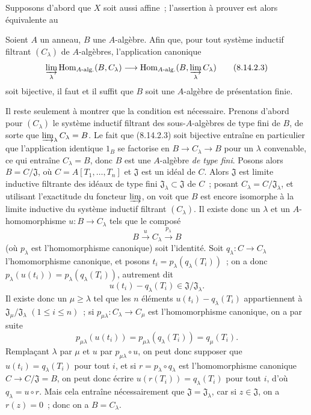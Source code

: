 Supposons d'abord que $X$ soit aussi affine~; l'assertion à prouver est alors
équivalente au

\begin{corollary}[8.14.2.2]
\label{IV.8.14.2.2-fr}
Soient $A$ un anneau, $B$ une $A$-algèbre. Afin que, pour tout système
inductif filtrant $(C_\lambda)$ de $A$-algèbres, l'application canonique
\begin{equation}
\label{IV.8.14.2.3-fr}
\varinjlim_\lambda\operatorname{Hom}_{A\text{-}\mathrm{alg.}}(B,C_\lambda)
\longrightarrow
\operatorname{Hom}_{A\text{-}\mathrm{alg.}}
(B,\varinjlim_\lambda C_\lambda) \tag{8.14.2.3}
\end{equation}
soit bijective, il faut et il suffit que $B$ soit une $A$-algèbre de
présentation finie.
\end{corollary}

Il reste seulement à montrer que la condition est nécessaire. Prenons d'abord
pour $(C_\lambda)$ le système inductif filtrant des sous-$A$-algèbres de type
fini de $B$, de sorte que $\varinjlim_\lambda C_\lambda=B$. Le fait que (8.14.2.3)
soit bijective entraîne en particulier que l'application identique
$1_B$ se factorise en $B\to C_\lambda\to B$ pour un $\lambda$ convenable,
ce qui entraîne $C_\lambda=B$, donc $B$ est une $A$-algèbre \emph{de type
fini}. Posons alors $B=C/\mathfrak J$, où
$C=A[T_1,\ldots,T_n]$ et $\mathfrak J$ est un idéal de $C$. Alors
$\mathfrak J$ est limite inductive filtrante des idéaux de type fini
$\mathfrak J_\lambda\subset\mathfrak J$ de $C$~; posant
$C_\lambda=C/\mathfrak J_\lambda$, et utilisant l'exactitude du foncteur
$\varinjlim$, on voit que $B$ est encore isomorphe à la limite inductive du
système inductif filtrant $(C_\lambda)$. Il existe donc un $\lambda$ et un
$A$-homomorphisme $u:B\to C_\lambda$ tels que le composé
\[
B\xrightarrow{u}C_\lambda\xrightarrow{p_\lambda}B
\]
(où $p_\lambda$ est l'homomorphisme canonique) soit l'identité. Soit
$q_\lambda:C\to C_\lambda$ l'homomorphisme canonique, et posons
$t_i=p_\lambda(q_\lambda(T_i))$~; on a donc
$p_\lambda(u(t_i))=p_\lambda(q_\lambda(T_i))$, autrement dit
\[
u(t_i)-q_\lambda(T_i)\in\mathfrak J/\mathfrak J_\lambda.
\]
Il existe donc un $\mu\geqslant\lambda$ tel que les $n$ éléments
$u(t_i)-q_\lambda(T_i)$ appartiennent à
$\mathfrak J_\mu/\mathfrak J_\lambda$ $(1\leqslant i\leqslant n)$~; si
$p_{\mu\lambda}:C_\lambda\to C_\mu$ est l'homomorphisme canonique, on a par
suite
\[
p_{\mu\lambda}(u(t_i))
=p_{\mu\lambda}(q_\lambda(T_i))=q_\mu(T_i).
\]
Remplaçant $\lambda$ par $\mu$ et $u$ par $p_{\mu\lambda}\circ u$, on peut
donc supposer que $u(t_i)=q_\lambda(T_i)$ pour tout $i$, et si
$r=p_\lambda\circ q_\lambda$ est l'homomorphisme canonique
$C\to C/\mathfrak J=B$, on peut donc écrire
$u(r(T_i))=q_\lambda(T_i)$ pour tout $i$, d'où
$q_\lambda=u\circ r$. Mais cela entraîne nécessairement que
$\mathfrak J=\mathfrak J_\lambda$, car si $z\in\mathfrak J$, on a
$r(z)=0$~; donc on a $B=C_\lambda$.

